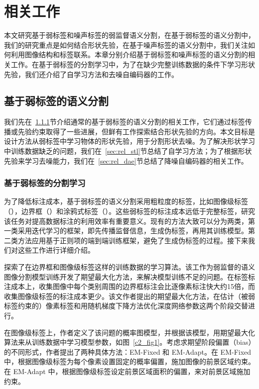 \chapter{相关工作}
本文研究基于弱标签和噪声标签的弱监督语义分割，在基于弱标签的语义分割中，我们的研究重点是如何结合形状先验，在基于噪声标签的语义分割中，我们关注如何利用图像结构和标签联系。本章分别介绍基于弱标签和噪声标签的语义分割的相关工作。在基于弱标签的分割学习中，为了在缺少完整训练数据的条件下学习形状先验，我们还介绍了自学习方法和去噪自编码器的工作。

\section{基于弱标签的语义分割}

我们先在~\ref{sec:rel_wss}节介绍通常的基于弱标签的语义分割的相关工作，它们通过标签传播或先验约束取得了一些进展，但鲜有工作探索结合形状先验的方向。本文目标是设计方法从弱标签中学习物体的形状先验，用于分割形状去噪。为了解决形状学习中训练数据缺乏的问题，我们在~\ref{sec:rel_stl}节总结了自学习方法；为了根据形状先验来学习去噪能力，我们在~\ref{sec:rel_dae}节总结了降噪自编码器的相关工作。

\subsection{基于弱标签的分割学习} \label{sec:rel_wss}

为了降低标注成本，基于弱标签的语义分割采用粗粒度的标签，比如图像级标签（\cite{wang2020self,fan2020learning,chang2020weakly}），边界框（\cite{papandreou2015weakly,khoreva2017simple,song2019box}）和涂鸦式标签（\cite{lin2016scribblesup,vernaza2017learning,tang2018regularized}）。这些弱标签的标注成本远低于完整标签，研究该任务对提高数据标注的利用效率有重要意义。现有的方法大致可以分为两类，第一类采用迭代学习的框架，即先传播监督信息，生成伪标签，再用其训练模型。第二类方法应用基于正则项的端到端训练框架，避免了生成伪标签的过程。接下来我们对这些工作进行详细介绍。


\citet{papandreou2015weakly}探索了在边界框和图像级标签这样的训练数据的学习算法。该工作为弱监督的语义图像分割模型训练开发了期望最大化方法，来解决模型训练不足的问题。在标签标注成本上，收集图像中每个类别周围的边界框标注会比逐像素标注快大约15倍\citep{lin2014microsoft}，而收集图像级标签的标注成本更少。该文作者提出的期望最大化方法，在估计（被弱标签约束的）像素标签和用随机梯度下降方法优化深度网络参数这两个阶段交替进行。

在图像级标签上，作者定义了该问题的概率图模型，并根据该模型，用期望最大化算法来从训练数据中学习模型参数，如图~\ref{c2_fig1}。考虑求期望阶段偏置（bias）的不同形式，作者提出了两种具体方法：EM-Fixed 和 EM-Adapt。在 EM-Fixed 中，根据图像级标签为每个像素设置固定的概率偏置，施加图像的前景区域约束。在 EM-Adapt 中，根据图像级标签设定前景区域面积的偏置，来对前景区域施加约束。


